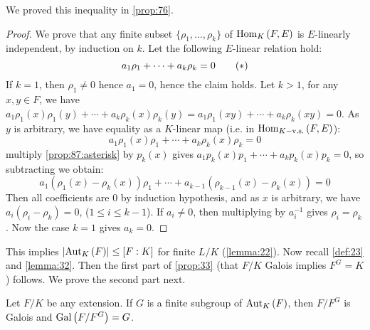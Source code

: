 We proved this inequality in \autoref{prop:76}.

\begin{proof}
  We prove that any finite subset $\{ \rho_1, \ldots, \rho_k \}$ of $\homset{F}{E}$ is $E$-linearly independent, by induction on $k$. Let the following $E$-linear relation hold: 
\[
a_1\rho_1 + \cdots + a_k\rho_k = 0 \tag{$\ast{}$} \label{prop:87:asterisk}
\] If $k = 1$, then $\rho_1 \neq 0$ hence $a_1 = 0$, hence the claim holds. Let $k > 1$, for any $x, y \in F$, we have $a_1\rho_1(x)\rho_1(y) + \cdots + a_k\rho_k(x)\rho_k(y) = a_1\rho_1(xy) + \cdots + a_k\rho_k(xy) = 0$. As $y$ is arbitrary, we have equality as a $K$-linear map (i.e. in $\homset[K-\text{v.s.}]{F}{E}$):
\[
a_1\rho_1(x)\rho_1 + \cdots + a_k\rho_k(x)\rho_k = 0
\]
multiply \eqref{prop:87:asterisk} by $p_k(x)$ gives $a_1p_k(x)p_1 + \dotsb + a_kp_k(x)p_k = 0$, so subtracting we obtain:
\[
a_1(\rho_1(x)-\rho_k(x))\rho_1 + \dotsb + a_{k-1}(\rho_{k-1}(x)-\rho_k(x)) = 0
\]
Then all coefficients are 0 by induction hypothesis, and as $x$ is arbitrary, we have $a_i(\rho_i -\rho_k) = 0$, ($1 \leq i \leq k-1$). If $a_i \neq 0$, then multiplying by $a_i^{-1}$ gives $\rho_i = \rho_k$. Now the case $k = 1$ gives $a_k = 0$.
\end{proof}

This implies $\card{\autset[K]{F}} \leq [F : K]$ for finite $L/K$ (\autoref{lemma:22}). Now recall \autoref{def:23} and \autoref{lemma:32}. Then the first part of \autoref{prop:33} (that $F/K$ Galois implies $F^G = K$) follows. We prove the second part next.

\begin{proposition}
  \label{prop:88}
  Let $F/K$ be any extension. If $G$ is a finite subgroup of $\autset[K]{F}$, then $F/F^G$ is Galois and $\Gal{F/F^G} = G$.
\end{proposition}

